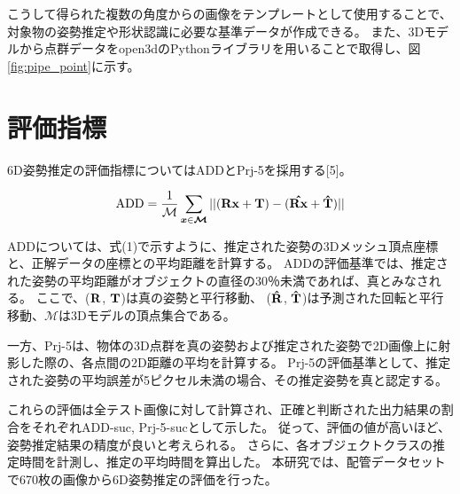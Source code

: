 こうして得られた複数の角度からの画像をテンプレートとして使用することで、対象物の姿勢推定や形状認識に必要な基準データが作成できる。
また、3Dモデルから点群データをopen3dのPythonライブラリを用いることで取得し、図\ref{fig:pipe_point}に示す。

\section{評価指標}
6D姿勢推定の評価指標についてはADDとPrj-5を採用する[5]。

\begin{equation}
\textrm{ADD} = \frac{1}{\mathcal{M}}\sum_{\boldsymbol{x}\in \boldsymbol{\mathcal{M}}}||(\boldsymbol{\textrm{\textbf{Rx}}} + \boldsymbol{\textrm{\textbf{\textbf{T}}}}) - (\boldsymbol{\hat{\textrm{\textbf{Rx}}}} +  \boldsymbol{\hat{\textrm{\textbf{T}}}})||
\end{equation}

ADDについては、式(1)で示すように、推定された姿勢の3Dメッシュ頂点座標と、正解データの座標との平均距離を計算する。
ADDの評価基準では、推定された姿勢の平均距離がオブジェクトの直径の30％未満であれば、真とみなされる。
ここで、($\boldsymbol{\textrm{\textbf{R}}}$, $\boldsymbol{\textrm{\textbf{T}}}$)は真の姿勢と平行移動、 ($\boldsymbol{\hat{\textrm{\textbf{R}}}}$, $\boldsymbol{\hat{\textrm{\textbf{T}}}}$)は予測された回転と平行移動、$\boldsymbol{\mathcal{M}}$は3Dモデルの頂点集合である。

一方、Prj-5は、物体の3D点群を真の姿勢および推定された姿勢で2D画像上に射影した際の、各点間の2D距離の平均を計算する。
Prj-5の評価基準として、推定された姿勢の平均誤差が5ピクセル未満の場合、その推定姿勢を真と認定する。

これらの評価は全テスト画像に対して計算され、正確と判断された出力結果の割合をそれぞれADD-suc, Prj-5-sucとして示した。
従って、評価の値が高いほど、姿勢推定結果の精度が良いと考えられる。
さらに、各オブジェクトクラスの推定時間を計測し、推定の平均時間を算出した。
本研究では、配管データセットで670枚の画像から6D姿勢推定の評価を行った。


